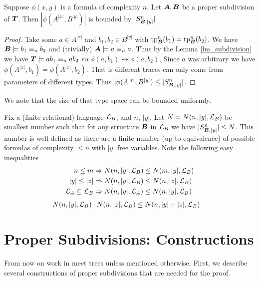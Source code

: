 \documentclass{amsart}
\DeclareMathOperator{\TT}{\boldface T}
\DeclareMathOperator{\A}{\boldface A}
\DeclareMathOperator{\B}{\boldface B}
\begin{document}
\begin{Corollary} \label{cor_type_count}
	Suppose $\phi(x,y)$ is a formula of complexity $n$. Let $\A, \B$ be a proper subdivision of $\TT$. Then $|\phi(A^{|x|}, B^{|y|})|$ is bounded by $|S^n_{\B, |y|}|$
\end{Corollary}

\begin{proof}
	Take some $a \in A^{|x|}$ and $b_1, b_2 \in B^{|y|}$ with $\tp^n_{\B}(b_1) = \tp^n_{\B}(b_2)$. We have $\B \models b_1 \equiv_n b_2$ and (trivially) $\A \models a \equiv_n a$. Thus by the Lemma \ref{lm_subdivision} we have $\TT \models ab_1 \equiv_n ab_2$ so $\phi(a, b_1) \leftrightarrow \phi(a, b_2)$. Since $a$ was arbitrary we have $\phi(A^{|x|}, b_1) = \phi(A^{|x|}, b_2)$. That is different traces can only come from parameters of different types. Thus $|\phi(A^{|x|}, B^{|y|}) \leq |S^n_{\B, |y|}|$.
\end{proof}

We note that the size of that type space can be bounded uniformly.

\begin{Definition} \label{def_type_count}
	Fix a (finite relational) language $\mathcal L_B$, and $n$, $|y|$. Let $N = N(n, |y|, \mathcal L_B)$ be smallest number such that for any structure $\B$ in $\mathcal L_B$ we have $|S^n_{\B, |y|}| \leq N$. This number is well-defined as there are a finite number (up to equivalence) of possible formulas of complexity $\leq n$ with $|y|$ free variables. Note the following easy inequalities
	\begin{align*}
		n \leq m &\Rightarrow N(n, |y|, \mathcal L_B) \leq N(m, |y|, \mathcal L_B) \\
		|y| \leq |z| &\Rightarrow N(n, |y|, \mathcal L_B) \leq N(n, |z|, \mathcal L_B) \\
		\mathcal L_A \subseteq \mathcal L_B &\Rightarrow N(n, |y|, \mathcal L_A) \leq N(n, |y|, \mathcal L_B)
	\end{align*}
	\begin{align*}
		N(n, |y|, \mathcal L_B) \cdot N(n, |z|, \mathcal L_B) &\leq N(n, |y|+|z|, \mathcal L_B) 
	\end{align*}
\end{Definition}

\section{Proper Subdivisions: Constructions}

From now on work in meet trees unless mentioned otherwise. First, we describe several constructions of proper subdivisions that are needed for the proof. 
\end{document}
